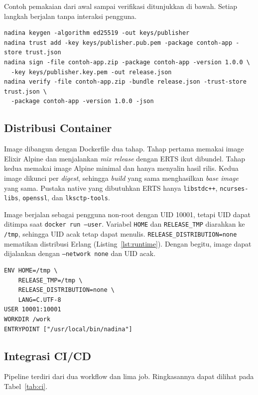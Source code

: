 Contoh pemakaian dari awal sampai verifikasi ditunjukkan di bawah. Setiap langkah berjalan tanpa
interaksi pengguna.

\begin{lstlisting}[basicstyle=\ttfamily\footnotesize,caption={Contoh pemakaian CLI},label={lst:pakai},numbers=none]
nadina keygen -algorithm ed25519 -out keys/publisher
nadina trust add -key keys/publisher.pub.pem -package contoh-app -store trust.json
nadina sign -file contoh-app.zip -package contoh-app -version 1.0.0 \
  -key keys/publisher.key.pem -out release.json
nadina verify -file contoh-app.zip -bundle release.json -trust-store trust.json \
  -package contoh-app -version 1.0.0 -json
\end{lstlisting}

\subsection{Distribusi Container}
Image dibangun dengan Dockerfile dua tahap. Tahap pertama memakai image Elixir Alpine dan
menjalankan \textit{mix release} dengan ERTS ikut dibundel. Tahap kedua memakai image Alpine
minimal dan hanya menyalin hasil rilis. Kedua image dikunci per \textit{digest}, sehingga
\textit{build} yang sama menghasilkan \textit{base image} yang sama. Pustaka native yang dibutuhkan
ERTS hanya \texttt{libstdc++}, \texttt{ncurses-libs}, \texttt{openssl}, dan \texttt{lksctp-tools}.

Image berjalan sebagai pengguna non-root dengan UID 10001, tetapi UID dapat ditimpa saat
\texttt{docker run --user}. Variabel \texttt{HOME} dan \texttt{RELEASE\_TMP} diarahkan ke
\texttt{/tmp}, sehingga UID acak tetap dapat menulis. \texttt{RELEASE\_DISTRIBUTION=none}
mematikan distribusi Erlang (Listing~\ref{lst:runtime}). Dengan begitu, image dapat dijalankan
dengan \texttt{--network none} dan UID acak.

\begin{lstlisting}[basicstyle=\ttfamily\footnotesize,caption={Tahap akhir Dockerfile},label={lst:runtime},numbers=none]
ENV HOME=/tmp \
    RELEASE_TMP=/tmp \
    RELEASE_DISTRIBUTION=none \
    LANG=C.UTF-8
USER 10001:10001
WORKDIR /work
ENTRYPOINT ["/usr/local/bin/nadina"]
\end{lstlisting}


\subsection{Integrasi CI/CD}
Pipeline terdiri dari dua workflow dan lima job. Ringkasannya dapat dilihat pada
Tabel~\ref{tab:ci}.

